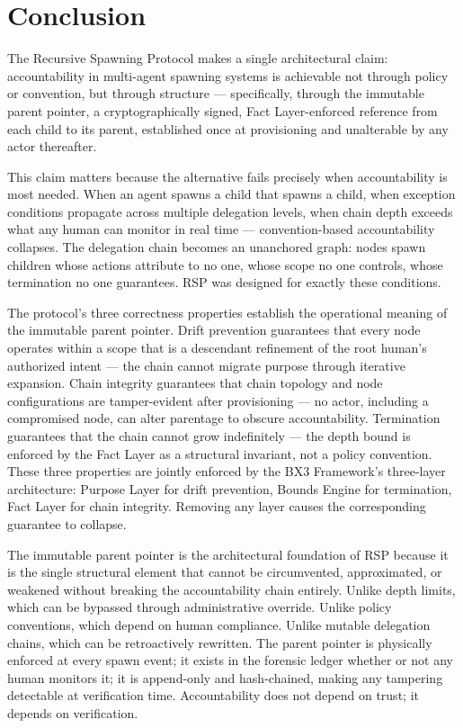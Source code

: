 \section{Conclusion}
\label{sec:rs-conclusion}

The Recursive Spawning Protocol makes a single architectural claim: accountability in multi-agent spawning systems is achievable not through policy or convention, but through structure — specifically, through the immutable parent pointer, a cryptographically signed, Fact Layer-enforced reference from each child to its parent, established once at provisioning and unalterable by any actor thereafter.

This claim matters because the alternative fails precisely when accountability is most needed. When an agent spawns a child that spawns a child, when exception conditions propagate across multiple delegation levels, when chain depth exceeds what any human can monitor in real time — convention-based accountability collapses. The delegation chain becomes an unanchored graph: nodes spawn children whose actions attribute to no one, whose scope no one controls, whose termination no one guarantees. RSP was designed for exactly these conditions.

The protocol's three correctness properties establish the operational meaning of the immutable parent pointer. Drift prevention guarantees that every node operates within a scope that is a descendant refinement of the root human's authorized intent — the chain cannot migrate purpose through iterative expansion. Chain integrity guarantees that chain topology and node configurations are tamper-evident after provisioning — no actor, including a compromised node, can alter parentage to obscure accountability. Termination guarantees that the chain cannot grow indefinitely — the depth bound is enforced by the Fact Layer as a structural invariant, not a policy convention. These three properties are jointly enforced by the BX3 Framework's three-layer architecture: Purpose Layer for drift prevention, Bounds Engine for termination, Fact Layer for chain integrity. Removing any layer causes the corresponding guarantee to collapse.

The immutable parent pointer is the architectural foundation of RSP because it is the single structural element that cannot be circumvented, approximated, or weakened without breaking the accountability chain entirely. Unlike depth limits, which can be bypassed through administrative override. Unlike policy conventions, which depend on human compliance. Unlike mutable delegation chains, which can be retroactively rewritten. The parent pointer is physically enforced at every spawn event; it exists in the forensic ledger whether or not any human monitors it; it is append-only and hash-chained, making any tampering detectable at verification time. Accountability does not depend on trust; it depends on verification.

